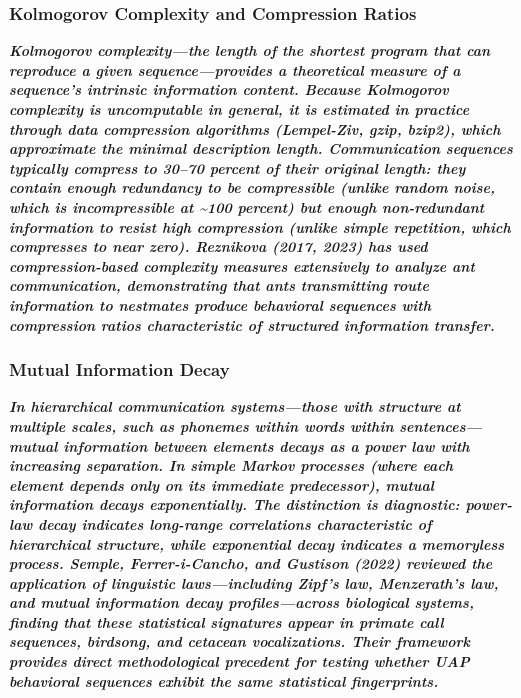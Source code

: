 \documentclass[11pt,letterpaper]{article}
\begin{document}
\subsubsection{Kolmogorov Complexity and Compression Ratios}

\textbf{\textit{Kolmogorov complexity---the length of the shortest program that can reproduce a given sequence---provides a theoretical measure of a sequence's intrinsic information content. Because Kolmogorov complexity is uncomputable in general, it is estimated in practice through data compression algorithms (Lempel-Ziv, gzip, bzip2), which approximate the minimal description length. Communication sequences typically compress to 30--70 percent of their original length: they contain enough redundancy to be compressible (unlike random noise, which is incompressible at \textasciitilde{}100 percent) but enough non-redundant information to resist high compression (unlike simple repetition, which compresses to near zero). Reznikova (2017, 2023) has used compression-based complexity measures extensively to analyze ant communication, demonstrating that ants transmitting route information to nestmates produce behavioral sequences with compression ratios characteristic of structured information transfer.}}


\subsubsection{Mutual Information Decay}

\textbf{\textit{In hierarchical communication systems---those with structure at multiple scales, such as phonemes within words within sentences---mutual information between elements decays as a power law with increasing separation. In simple Markov processes (where each element depends only on its immediate predecessor), mutual information decays exponentially. The distinction is diagnostic: power-law decay indicates long-range correlations characteristic of hierarchical structure, while exponential decay indicates a memoryless process. Semple, Ferrer-i-Cancho, and Gustison (2022) reviewed the application of linguistic laws---including Zipf's law, Menzerath's law, and mutual information decay profiles---across biological systems, finding that these statistical signatures appear in primate call sequences, birdsong, and cetacean vocalizations. Their framework provides direct methodological precedent for testing whether UAP behavioral sequences exhibit the same statistical fingerprints.}}
\end{document}

